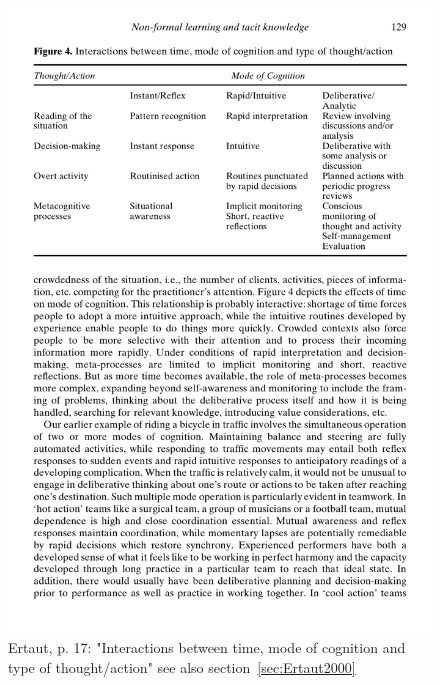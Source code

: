 \documentclass[12pt,a4paper]{article}
\begin{document}
    \begin{figure}[htb]
      \centering
      \includegraphics[width=12cm]{Meeting 4 NON-FORMAL LEARNING - Seite 17.pdf}
      \caption{Ertaut, p. 17: "Interactions between time, mode of cognition and type of thought/action" see also section~\ref{sec:Ertaut2000}}
      \label{fig:Ertaut cognitioninteractions}
    \end{figure}
\end{document}
